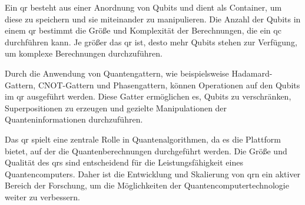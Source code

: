 Ein \ac{qr} besteht aus einer Anordnung von Qubits und dient als Container, um diese zu speichern und sie miteinander zu manipulieren. Die Anzahl der Qubits in einem \ac{qr} bestimmt die Größe und Komplexität der Berechnungen, die ein \ac{qc} durchführen kann. Je größer das \ac{qr} ist, desto mehr Qubits stehen zur Verfügung, um komplexe Berechnungen durchzuführen.

Durch die Anwendung von Quantengattern, wie beispielsweise Hadamard-Gattern, CNOT-Gattern und Phasengattern, können Operationen auf den Qubits im \ac{qr} ausgeführt werden. Diese Gatter ermöglichen es, Qubits zu verschränken, Superpositionen zu erzeugen und gezielte Manipulationen der Quanteninformationen durchzuführen.

Das \ac{qr} spielt eine zentrale Rolle in Quantenalgorithmen, da es die Plattform bietet, auf der die Quantenberechnungen durchgeführt werden. Die Größe und Qualität des \ac{qr}s sind entscheidend für die Leistungsfähigkeit eines Quantencomputers. Daher ist die Entwicklung und Skalierung von \ac{qr}n ein aktiver Bereich der Forschung, um die Möglichkeiten der Quantencomputertechnologie weiter zu verbessern.

